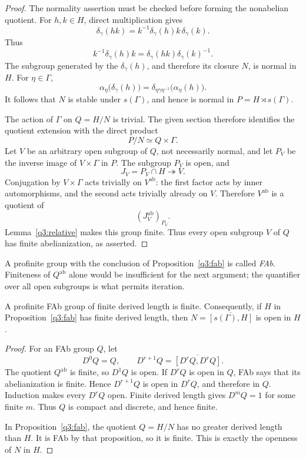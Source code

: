 \begin{proof}
The normality assertion must be checked before forming the
nonabelian quotient.  For \(h,k\in H\), direct multiplication gives
\[
\delta_\gamma(hk)
=k^{-1}\delta_\gamma(h)k\,\delta_\gamma(k).
\]
Thus
\[
k^{-1}\delta_\gamma(h)k
=\delta_\gamma(hk)\delta_\gamma(k)^{-1}.
\]
The subgroup generated by the \(\delta_\gamma(h)\), and therefore
its closure \(N\), is normal in \(H\).  For \(\eta\in\Gamma\),
\[
\alpha_\eta\bigl(\delta_\gamma(h)\bigr)
=\delta_{\eta\gamma\eta^{-1}}\bigl(\alpha_\eta(h)\bigr).
\]
It follows that \(N\) is stable under \(s(\Gamma)\), and hence is
normal in \(P=H\rtimes s(\Gamma)\).

The action of \(\Gamma\) on \(Q=H/N\) is trivial.  The given section
therefore identifies the quotient extension with the direct product
\[
P/N\simeq Q\times\Gamma.
\]
Let \(V\) be an arbitrary open subgroup of \(Q\), not necessarily
normal, and let \(P_V\) be the inverse image of \(V\times\Gamma\)
in \(P\).  The subgroup \(P_V\) is open, and
\[
J_V=P_V\cap H\twoheadrightarrow V.
\]
Conjugation by \(V\times\Gamma\) acts trivially on
\(V^{\mathrm{ab}}\): the first factor acts by inner automorphisms,
and the second acts trivially already on \(V\).  Therefore
\(V^{\mathrm{ab}}\) is a quotient of
\[
(J_V^{\mathrm{ab}})_{P_V}.
\]
Lemma~\ref{q3:relative} makes this group finite.  Thus every open
subgroup \(V\) of \(Q\) has finite abelianization, as asserted.
\end{proof}

A profinite group with the conclusion of
Proposition~\ref{q3:fab} is called \emph{FAb}.  Finiteness of
\(Q^{\mathrm{ab}}\) alone would be insufficient for the next
argument; the quantifier over all open subgroups is what permits
iteration.

\begin{lemma}
\label{q3:soluble}
A profinite FAb group of finite derived length is finite.
Consequently, if \(H\) in Proposition~\ref{q3:fab} has finite
derived length, then \(N=\overline{[s(\Gamma),H]}\) is open in \(H\).
\end{lemma}

\begin{proof}
For an FAb group \(Q\), let
\[
D^0Q=Q,\qquad
D^{r+1}Q=\overline{[D^rQ,D^rQ]}.
\]
The quotient \(Q^{\mathrm{ab}}\) is finite, so \(D^1Q\) is open.
If \(D^rQ\) is open in \(Q\), FAb says that its abelianization is
finite.  Hence \(D^{r+1}Q\) is open in \(D^rQ\), and therefore in
\(Q\).  Induction makes every \(D^rQ\) open.  Finite derived length
gives \(D^mQ=1\) for some finite \(m\).  Thus \(Q\) is compact and
discrete, and hence finite.

In Proposition~\ref{q3:fab}, the quotient \(Q=H/N\) has no greater
derived length than \(H\).  It is FAb by that proposition, so it is
finite.  This is exactly the openness of \(N\) in \(H\).
\end{proof}

